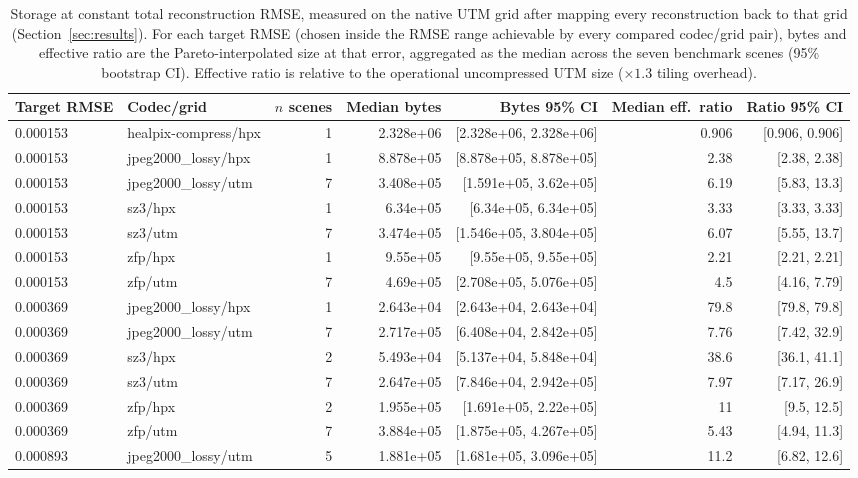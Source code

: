 \begin{table}[t]
\centering
\caption{Storage at constant total reconstruction RMSE, measured on the native UTM grid after mapping every reconstruction back to that grid (Section~\ref{sec:results}). For each target RMSE (chosen inside the RMSE range achievable by every compared codec/grid pair), bytes and effective ratio are the Pareto-interpolated size at that error, aggregated as the median across the seven benchmark scenes (95\% bootstrap CI). Effective ratio is relative to the operational uncompressed UTM size ($\times1.3$ tiling overhead).}
\label{tab:storage_at_constant_rmse}
\begin{tabular}{@{}llrrrrr@{}}
\toprule
Target RMSE & Codec/grid & $n$ scenes & Median bytes & Bytes 95\% CI & Median eff.\ ratio & Ratio 95\% CI \\
\midrule
0.000153 & healpix-compress/hpx & 1 & 2.328e+06 & [2.328e+06, 2.328e+06] & 0.906 & [0.906, 0.906] \\
0.000153 & jpeg2000_lossy/hpx & 1 & 8.878e+05 & [8.878e+05, 8.878e+05] & 2.38 & [2.38, 2.38] \\
0.000153 & jpeg2000_lossy/utm & 7 & 3.408e+05 & [1.591e+05, 3.62e+05] & 6.19 & [5.83, 13.3] \\
0.000153 & sz3/hpx & 1 & 6.34e+05 & [6.34e+05, 6.34e+05] & 3.33 & [3.33, 3.33] \\
0.000153 & sz3/utm & 7 & 3.474e+05 & [1.546e+05, 3.804e+05] & 6.07 & [5.55, 13.7] \\
0.000153 & zfp/hpx & 1 & 9.55e+05 & [9.55e+05, 9.55e+05] & 2.21 & [2.21, 2.21] \\
0.000153 & zfp/utm & 7 & 4.69e+05 & [2.708e+05, 5.076e+05] & 4.5 & [4.16, 7.79] \\
0.000369 & jpeg2000_lossy/hpx & 1 & 2.643e+04 & [2.643e+04, 2.643e+04] & 79.8 & [79.8, 79.8] \\
0.000369 & jpeg2000_lossy/utm & 7 & 2.717e+05 & [6.408e+04, 2.842e+05] & 7.76 & [7.42, 32.9] \\
0.000369 & sz3/hpx & 2 & 5.493e+04 & [5.137e+04, 5.848e+04] & 38.6 & [36.1, 41.1] \\
0.000369 & sz3/utm & 7 & 2.647e+05 & [7.846e+04, 2.942e+05] & 7.97 & [7.17, 26.9] \\
0.000369 & zfp/hpx & 2 & 1.955e+05 & [1.691e+05, 2.22e+05] & 11 & [9.5, 12.5] \\
0.000369 & zfp/utm & 7 & 3.884e+05 & [1.875e+05, 4.267e+05] & 5.43 & [4.94, 11.3] \\
0.000893 & jpeg2000_lossy/utm & 5 & 1.881e+05 & [1.681e+05, 3.096e+05] & 11.2 & [6.82, 12.6] \\

\end{tabular}
\end{table}
